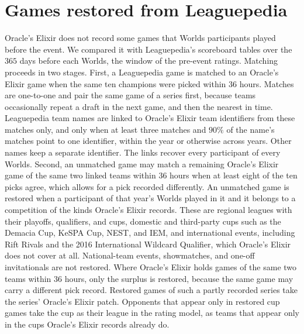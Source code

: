 \documentclass[11pt]{article}
\begin{document}



\appendix
\FloatBarrier
\section{Games restored from Leaguepedia}
\label{app:supplement}
Oracle's Elixir does not record some games that Worlds participants played before the event. We compared it with Leaguepedia's scoreboard tables \citep{leaguepedia} over the $365$ days before each Worlds, the window of the pre-event ratings. Matching proceeds in two stages. First, a Leaguepedia game is matched to an Oracle's Elixir game when the same ten champions were picked within $36$ hours. Matches are one-to-one and pair the same game of a series first, because teams occasionally repeat a draft in the next game, and then the nearest in time. Leaguepedia team names are linked to Oracle's Elixir team identifiers from these matches only, and only when at least three matches and $90\%$ of the name's matches point to one identifier, within the year or otherwise across years. Other names keep a separate identifier. The links recover every participant of every Worlds. Second, an unmatched game may match a remaining Oracle's Elixir game of the same two linked teams within $36$ hours when at least eight of the ten picks agree, which allows for a pick recorded differently. An unmatched game is restored when a participant of that year's Worlds played in it and it belongs to a competition of the kinds Oracle's Elixir records. These are regional leagues with their playoffs, qualifiers, and cups, domestic and third-party cups such as the Demacia Cup, KeSPA Cup, NEST, and IEM, and international events, including Rift Rivals and the 2016 International Wildcard Qualifier, which Oracle's Elixir does not cover at all. National-team events, showmatches, and one-off invitationals are not restored. Where Oracle's Elixir holds games of the same two teams within $36$ hours, only the surplus is restored, because the same game may carry a different pick record. Restored games of such a partly recorded series take the series' Oracle's Elixir patch. Opponents that appear only in restored cup games take the cup as their league in the rating model, as teams that appear only in the cups Oracle's Elixir records already do.
\end{document}

